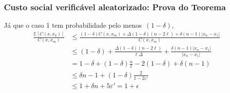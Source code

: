 \documentclass[usenames,dvipsnames]{beamer}
\begin{document}
\begin{frame}
\frametitle{Custo social verificável aleatorizado: Prova do Teorema}

Já que o caso 1 tem probabilidade pelo menos~$(1 - \delta)$,
\begin{align*}
\frac{\mathbb{E}[C(x,x_k)]}{C(x,x_m)} & \leq \frac{(1-\delta)C(x,x_m) + \Delta(1-\delta)(n-2\ell) + \delta(n-1)|x_n - x_1|}{C(x,x_m)} \\
& \leq (1 - \delta) + \frac{\Delta(1-\delta)(n - 2\ell)}{\ell \Delta} + \frac{\delta(n-1)|x_n - x_1|}{|x_n - x_1|} \\
& = 1 - \delta + (1-\delta)\frac{n}{\ell} - 2(1-\delta) + \delta(n-1) \\
& \leq \delta n - 1 + (1 - \delta)\frac{2}{1 - 2\varepsilon'} \\
& \leq 1 + \delta n + 5 \varepsilon' = 1 + \epsilon
\end{align*}

\end{frame}
\end{document}
